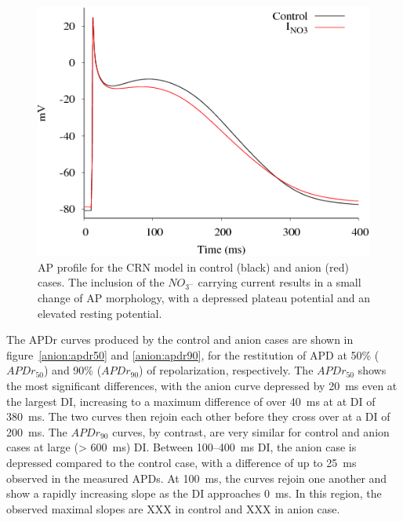 \begin{figure}
\includegraphics{figures/toolkit/anion/01_AP}
\caption[Anion Sensitive AP Profile]{\label{anion:ap} AP profile for the CRN
model in control (black) and anion (red) cases.  The inclusion of the
$NO_{3^{-}}$ carrying current results in a small change of AP morphology, with
a depressed plateau potential and an elevated resting potential.}
\end{figure}

The APDr curves produced by the control and anion cases are shown in
figure~\ref{anion:apdr50} and \ref{anion:apdr90}, for the restitution of APD at
50\% ($APDr_{50}$) and 90\% ($APDr_{90}$) of repolarization, respectively.  The
$APDr_{50}$ shows the most significant differences, with the anion
curve depressed by 20~ms even at the largest DI, increasing to a maximum
difference of over 40~ms at at DI of 380~ms.  The two curves then rejoin each
other before they cross over at a DI of 200~ms.  The $APDr_{90}$ curves, by
contrast, are very similar for control and anion cases at large (> 600~ms) DI.
Between 100--400~ms DI, the anion case is depressed compared to the control
case, with a difference of up to 25~ms observed in the measured APDs.  At
100~ms, the curves rejoin one another and show a rapidly increasing slope as the
DI approaches 0~ms.  In this region, the observed maximal slopes are XXX in
control and XXX in anion case.


